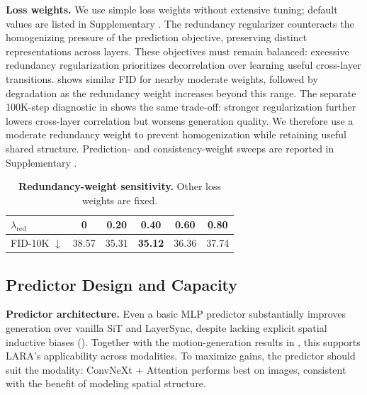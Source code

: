 \textbf{Loss weights.} We use simple loss weights without extensive tuning; default values are listed in Supplementary . The redundancy regularizer counteracts the homogenizing pressure of the prediction objective, preserving distinct representations across layers. These objectives must remain balanced: excessive redundancy regularization prioritizes decorrelation over learning useful cross-layer transitions.  shows similar FID for nearby moderate weights, followed by degradation as the redundancy weight increases beyond this range. The separate 100K-step diagnostic in  shows the same trade-off: stronger regularization further lowers cross-layer correlation but worsens generation quality. We therefore use a moderate redundancy weight to prevent homogenization while retaining useful shared structure. Prediction- and consistency-weight sweeps are reported in Supplementary .

\begin{table}[!htbp]
    \centering
    \caption{\textbf{Redundancy-weight sensitivity.} Other loss weights are fixed.}
    \label{tab:redundancy_weight_sensitivity}
    \small
    \setlength{\tabcolsep}{3pt}
    \begin{tabular*}{\linewidth}{@{\extracolsep{\fill}}lccccc@{}}
        \toprule
        $\lambda_{\mathrm{red}}$ & 0 & 0.20 & 0.40 & 0.60 & 0.80 \\
        \midrule
        FID-10K $\downarrow$ & 38.57 & 35.31 & \textbf{35.12} & 36.36 & 37.74 \\
        \bottomrule
    \end{tabular*}
\end{table}

\subsection{Predictor Design and Capacity}
\label{sec:predictor_ablation}

\textbf{Predictor architecture.} Even a basic MLP predictor substantially improves generation over vanilla SiT and LayerSync, despite lacking explicit spatial inductive biases (). Together with the motion-generation results in , this supports LARA's applicability across modalities. To maximize gains, the predictor should suit the modality: ConvNeXt + Attention performs best on images, consistent with the benefit of modeling spatial structure.

